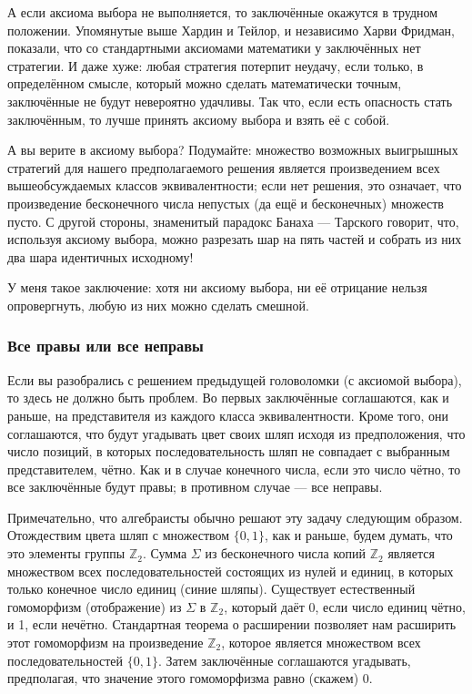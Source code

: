 А если аксиома выбора не выполняется, то заключённые окажутся в трудном положении.
Упомянутые выше Хардин и Тейлор, и независимо Харви Фридман, показали, что со стандартными аксиомами математики у заключённых нет стратегии.
И даже хуже: любая стратегия потерпит неудачу, если только, в определённом смысле, который можно сделать математически точным, заключённые не будут невероятно удачливы.
Так что, если есть опасность стать заключённым, то лучше принять аксиому выбора и взять её с собой.

А вы верите в аксиому выбора?
Подумайте: множество возможных выигрышных стратегий для нашего предполагаемого решения является произведением всех вышеобсуждаемых классов эквивалентности; если нет решения, это означает, что произведение бесконечного числа непустых (да ещё и бесконечных) множеств пусто.
С другой стороны, знаменитый парадокс Банаха --- Тарского говорит, что, используя аксиому выбора, можно разрезать шар на пять частей и собрать из них два шара идентичных исходному!

У меня такое заключение: хотя ни аксиому выбора, ни её отрицание нельзя опровергнуть, любую из них можно сделать смешной.



\subsubsection*{Все правы или все неправы}

Если вы разобрались с решением предыдущей головоломки (с аксиомой выбора), то здесь не должно быть проблем.
Во первых заключённые соглашаются, как и раньше, на представителя из каждого класса эквивалентности.
Кроме того, они соглашаются, что будут угадывать цвет своих шляп исходя из предположения, что число позиций, в которых последовательность шляп не совпадает с выбранным представителем, чётно.
Как и в случае конечного числа, если это число чётно, то все заключённые будут правы; в противном случае --- все неправы.

Примечательно, что алгебраисты обычно решают эту задачу следующим образом.
Отождествим цвета шляп с множеством $\{0, 1\}$, как и раньше, 
будем думать, что это элементы группы $\mathbb{Z}_2$.
Сумма $\Sigma$ из бесконечного числа копий $\mathbb{Z}_2$ является множеством всех последовательностей состоящих из нулей и единиц, в которых только конечное число единиц (синие шляпы).
Существует естественный гомоморфизм (отображение) из $\Sigma$ в $\mathbb{Z}_2$, который даёт 0, если число единиц чётно, и 1, если нечётно.
Стандартная теорема о расширении позволяет нам расширить этот гомоморфизм на произведение $\mathbb{Z}_2$, которое является множеством всех последовательностей $\{0, 1\}$.
Затем заключённые соглашаются угадывать, предполагая, что значение этого гомоморфизма равно (скажем) 0.


